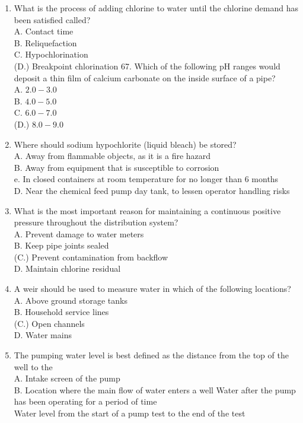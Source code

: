 \documentclass[10pt]{article}
\begin{document}
\begin{enumerate}
  \item What is the process of adding chlorine to water until the chlorine demand has been satisfied called?\\
A. Contact time\\
B. Reliquefaction\\
C. Hypochlorination\\
(D.) Breakpoint chlorination 67. Which of the following pH ranges would deposit a thin film of calcium carbonate on the inside surface of a pipe?\\
A. $2.0-3.0$\\
B. $4.0-5.0$\\
C. $6.0-7.0$\\
(D.) $8.0-9.0$

  \item Where should sodium hypochlorite (liquid bleach) be stored?\\
A. Away from flammable objects, as it is a fire hazard\\
B. Away from equipment that is susceptible to corrosion\\
e. In closed containers at room temperature for no longer than 6 months\\
D. Near the chemical feed pump day tank, to lessen operator handling risks

  \item What is the most important reason for maintaining a continuous positive pressure throughout the distribution system?\\
A. Prevent damage to water meters\\
B. Keep pipe joints sealed\\
(C.) Prevent contamination from backflow\\
D. Maintain chlorine residual

  \item A weir should be used to measure water in which of the following locations?\\
A. Above ground storage tanks\\
B. Household service lines\\
(C.) Open channels\\
D. Water mains

  \item The pumping water level is best defined as the distance from the top of the well to the\\
A. Intake screen of the pump\\
B. Location where the main flow of water enters a well Water after the pump has been operating for a period of time\\
Water level from the start of a pump test to the end of the test

\end{enumerate}
\end{document}
